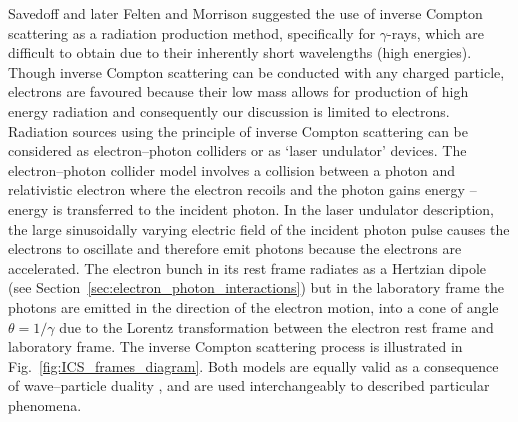 \documentclass[../main.tex]{subfiles}
\begin{document}
Savedoff \cite{savedoff1959crab} and later Felten and Morrison \cite{felten1963recoil} suggested the use of inverse Compton scattering as a radiation production method, specifically for $\gamma$-rays, which are difficult to obtain due to their inherently short wavelengths (high energies). Though inverse Compton scattering can be conducted with any charged particle, electrons are favoured because their low mass allows for production of high energy radiation and consequently our discussion is limited to electrons. Radiation sources using the principle of inverse Compton scattering can be considered as electron--photon colliders or as `laser undulator' devices. The electron--photon collider model involves a collision between a photon and relativistic electron where the electron recoils and the photon gains energy -- energy is transferred to the incident photon. In the laser undulator description, the large sinusoidally varying electric field of the incident photon pulse causes the electrons to oscillate and therefore emit photons because the electrons are accelerated. The electron bunch in its rest frame radiates as a Hertzian dipole (see Section~\ref{sec:electron_photon_interactions}) but in the laboratory frame the photons are emitted in the direction of the electron motion, into a cone of angle $\theta = 1/\gamma$ due to the Lorentz transformation between the electron rest frame and laboratory frame. The inverse Compton scattering process is illustrated in Fig.~\ref{fig:ICS_frames_diagram}. Both models are equally valid as a consequence of wave--particle duality \cite{de1923waves}, and are used interchangeably to described particular phenomena. 
\end{document}
